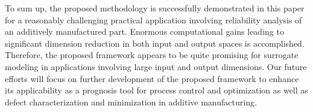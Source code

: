To sum up, the proposed methodology is successfully demonstrated in this paper for a reasonably challenging practical
application involving reliability analysis of an additively manufactured part. 
Enormous computational gains leading to significant dimension reduction in both input and output spaces
is accomplished. Therefore,
the proposed framework appears to be quite promising for surrogate modeling in applications involving large input and
output dimensions. Our future efforts will focus on further development of the proposed framework to enhance its
applicability as a prognosis tool for process control and optimization as well as defect characterization and minimization in 
additive manufacturing.

























